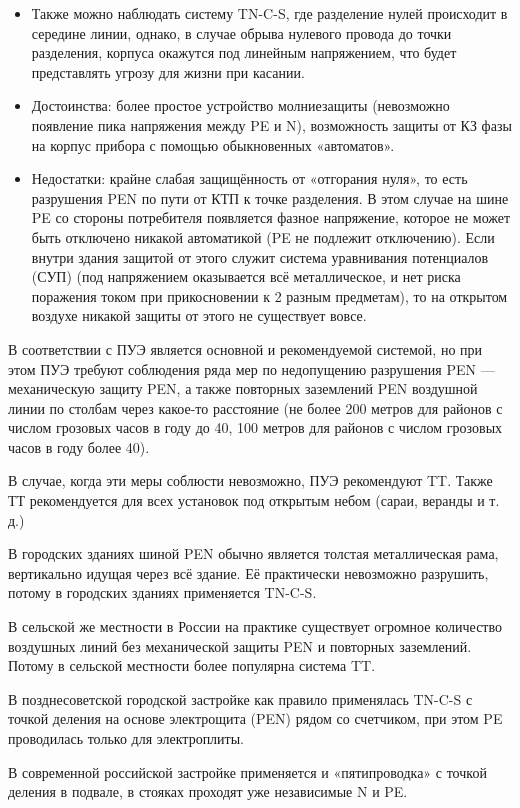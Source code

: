 \documentclass[10pt, twocolumn]{report}
\begin{document}
\begin{itemize}
\item Также можно наблюдать систему TN-C-S, где разделение нулей происходит в середине линии, однако, в случае обрыва нулевого провода до точки разделения, корпуса окажутся под линейным напряжением, что будет представлять угрозу для жизни при касании.
\item Достоинства: более простое устройство молниезащиты (невозможно появление пика напряжения между PE и N), возможность защиты от КЗ фазы на корпус прибора с помощью обыкновенных «автоматов».
\item Недостатки: крайне слабая защищённость от «отгорания нуля», то есть разрушения PEN по пути от КТП к точке разделения. В этом случае на шине PE со стороны потребителя появляется фазное напряжение, которое не может быть отключено никакой автоматикой (PE не подлежит отключению). Если внутри здания защитой от этого служит система уравнивания потенциалов (СУП) (под напряжением оказывается всё металлическое, и нет риска поражения током при прикосновении к 2 разным предметам), то на открытом воздухе никакой защиты от этого не существует вовсе.
\end{itemize}

В соответствии с ПУЭ является основной и рекомендуемой системой, но при этом ПУЭ требуют соблюдения ряда мер по недопущению разрушения PEN — механическую защиту PEN, а также повторных заземлений PEN воздушной линии по столбам через какое-то расстояние (не более 200 метров для районов с числом грозовых часов в году до 40, 100 метров для районов с числом грозовых часов в году более 40).

В случае, когда эти меры соблюсти невозможно, ПУЭ рекомендуют TT. Также ТТ рекомендуется для всех установок под открытым небом (сараи, веранды и т. д.)

В городских зданиях шиной PEN обычно является толстая металлическая рама, вертикально идущая через всё здание. Её практически невозможно разрушить, потому в городских зданиях применяется TN-C-S.

В сельской же местности в России на практике существует огромное количество воздушных линий без механической защиты PEN и повторных заземлений. Потому в сельской местности более популярна система TT.

В позднесоветской городской застройке как правило применялась TN-C-S с точкой деления на основе электрощита (PEN) рядом со счетчиком, при этом PE проводилась только для электроплиты.

В современной российской застройке применяется и «пятипроводка» с точкой деления в подвале, в стояках проходят уже независимые N и PE. 
\end{document}
